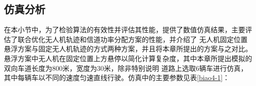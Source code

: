\subsection{仿真分析}\label{section4-5-2}
在本小节中，为了检验算法的有效性并评估其性能，提供了数值仿真结果，主要评估了联合优化无人机轨迹和信道功率分配方案的性能，并介绍了
无人机固定位置悬浮方案与固定无人机轨迹的方式两种方案，并且将本章所提出的方案与之对比。
悬浮方案中无人机在固定位置上方悬停以简化计算复杂度，其中本章所提出模拟的双向车道长度为800米，宽度为30米，除非特别说明
道路上选取6辆车进行仿真，其中每辆车以不同的速度匀速直线行驶。仿真中的主要参数见表\ref{biao4-1}：

